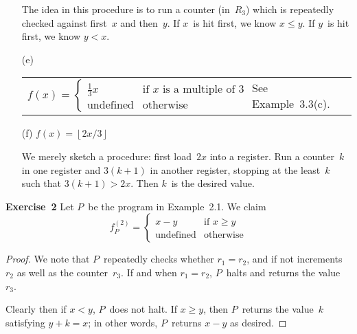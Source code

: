 \documentclass[letterpaper]{article}
\newcommand{\exercise}[2][]{\noindent\textbf{Exercise~{#2}}\ifthenelse{\isempty{#1}}{\textbf{.}}{ ({#1})\textbf{.}}}
\newcommand{\floor}[1]{\left\lfloor{#1}\right\rfloor}
\newcommand{\func}[2]{f_{#1}^{(#2)}}
\theoremstyle{plain}
\theoremstyle{definition}
\theoremstyle{remark}
\begin{document}
\begin{enumerate}
The idea in this procedure is to run a counter (in~$R_3$) which is repeatedly checked against first~$x$ and then~$y$. If $x$~is hit first, we know $x\le y$. If $y$~is hit first, we know $y<x$.

\item[(e)]
\begin{tabular}{p{200px}l}
$f(x)=\begin{cases}\tfrac{1}{3}x&\text{if }x\text{ is a multiple of~3}\\\text{undefined}&\text{otherwise}\end{cases}$&
See Example~3.3(c).
\end{tabular}

\item[(f)] $f(x)=\floor{2x/3}$

We merely sketch a procedure: first load~$2x$ into a register. Run a counter~$k$ in one register and $3(k+1)$ in another register, stopping at the least~$k$ such that $3(k+1)>2x$. Then $k$~is the desired value.
\end{enumerate}

\exercise{2}
Let $P$~be the program in Example~2.1. We claim
$$\func{P}{2}=
\begin{cases}
x-y&\text{if }x\ge y\\
\text{undefined}&\text{otherwise}
\end{cases}$$
\begin{proof}
We note that $P$~repeatedly checks whether $r_1=r_2$, and if not increments~$r_2$ as well as the counter~$r_3$. If and when $r_1=r_2$, $P$~halts and returns the value~$r_3$.

Clearly then if $x<y$, $P$~does not halt. If $x\ge y$, then $P$~returns the value~$k$ satisfying $y+k=x$; in other words, $P$~returns $x-y$ as desired.
\end{proof}
\end{document}
